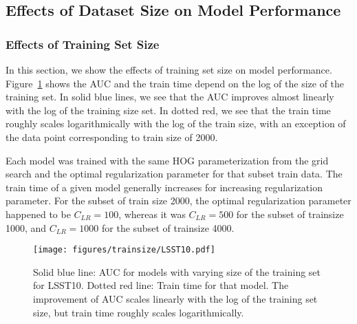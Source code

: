 \documentclass{emulateapj}
\begin{document}
\subsection{Effects of Dataset Size on Model Performance}\label{sec:datasize}
\subsubsection{Effects of Training Set Size}\label{sec:trainsetsize}
In this section, we show the effects of training set size on model
performance.  Figure~\ref{fig:trainsize} shows the AUC and the train
time depend on the log of the size of the training set.  In solid blue
lines, we see that the AUC improves almost linearly with the log of
the training size set.  In dotted red, we see that the train time
roughly scales logarithmically with the log of the train size, with an
exception of the data point corresponding to train size of 2000.

Each model was trained with the same HOG parameterization from the
grid search and the optimal regularization parameter for that subset
train data.  The train time of a given model generally increases for
increasing regularization parameter.  For the subset of train size
2000, the optimal regularization parameter happened to be
$C_{LR}=100$, whereas it was $C_{LR}=500$ for the subset of trainsize
1000, and $C_{LR}=1000$ for the subset of trainsize 4000.

\begin{figure}[t]\label{fig:trainsize}
\begin{center}
\texttt{[image: figures/trainsize/LSST10.pdf]}
\caption{Solid blue line: AUC for models with varying size of the
  training set for LSST10.  Dotted red line: Train time for that
  model.  The improvement of AUC scales linearly with the log of the
  training set size, but train time roughly scales logarithmically.}
\end{center}
\end{figure}


\end{document}
